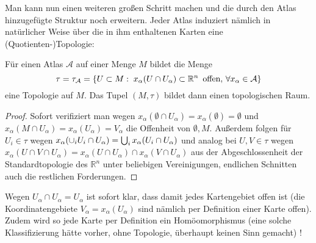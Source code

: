 \documentclass[../H_Analysis_main.tex]{subfiles}
\begin{document}
Man kann nun einen weiteren großen Schritt machen und die durch den Atlas hinzugefügte Struktur noch erweitern. Jeder Atlas induziert nämlich in natürlicher Weise über die in ihm enthaltenen Karten eine (Quotienten-)Topologie:
\begin{lemma}\label{lemma:ind_top_mf}
Für einen Atlas $\mathcal{A}$ auf einer Menge $M$ bildet die Menge
\begin{equation}
\tau = \tau_{\mathcal{A}} = \qty{U \subset M: \; x_\alpha(U \cap U_\alpha) \subset \mathbb{R}^n \, \text{ offen}, \, \forall x_\alpha \in \mathcal{A}}
\end{equation}
eine Topologie auf $M$. Das Tupel $(M, \tau)$ bildet dann einen topologischen Raum.
\end{lemma}
\begin{proof}
Sofort verifiziert man wegen $x_\alpha(\emptyset \cap U_\alpha) = x_\alpha(\emptyset) = \emptyset$ und $x_\alpha(M \cap U_\alpha) = x_\alpha(U_\alpha) = V_\alpha$ die Offenheit von $\emptyset, M$. Außerdem folgen für $U_i \in \tau$ wegen $x_\alpha\qty(\cup_i U_i \cap U_\alpha) = \bigcup_i x_\alpha\qty(U_i \cap U_\alpha)$ und analog bei $U, V \in \tau$ wegen $x_\alpha(U \cap V \cap U_\alpha) = x_\alpha(U \cap U_\alpha) \cap x_\alpha(V \cap U_\alpha)$ aus der Abgeschlossenheit der Standardtopologie des $\mathbb{R}^n$ unter beliebigen Vereinigungen, endlichen Schnitten auch die restlichen Forderungen.
%
%
\end{proof}
Wegen $U_\alpha \cap U_\alpha = U_\alpha$ ist sofort klar, dass damit jedes Kartengebiet offen ist (die Koordinatengebiete $V_\alpha = x_\alpha(U_\alpha)$ sind nämlich per Definition einer Karte offen). Zudem wird so jede Karte per Definition ein Homöomorphismus (eine solche Klassifizierung hätte vorher, ohne Topologie, überhaupt keinen Sinn gemacht) !
\end{document}
